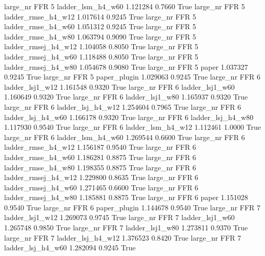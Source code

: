   large_nr      FFR                 5   ladder_lsm_h4_w60   1.121284      0.7660    True
  large_nr      FFR                 5  ladder_rmse_h4_w12   1.017614      0.9245    True
  large_nr      FFR                 5  ladder_rmse_h4_w60   1.051312      0.9245    True
  large_nr      FFR                 5  ladder_rmse_h4_w80   1.063794      0.9090    True
  large_nr      FFR                 5 ladder_rmsej_h4_w12   1.104058      0.8050    True
  large_nr      FFR                 5 ladder_rmsej_h4_w60   1.118488      0.8050    True
  large_nr      FFR                 5 ladder_rmsej_h4_w80   1.054678      0.9080    True
  large_nr      FFR                 5               paper   1.037327      0.9245    True
  large_nr      FFR                 5        paper_plugin   1.029063      0.9245    True
  large_nr      FFR                 6     ladder_lsj1_w12   1.161548      0.9320    True
  large_nr      FFR                 6     ladder_lsj1_w60   1.160649      0.9320    True
  large_nr      FFR                 6     ladder_lsj1_w80   1.165937      0.9320    True
  large_nr      FFR                 6   ladder_lsj_h4_w12   1.254604      0.7965    True
  large_nr      FFR                 6   ladder_lsj_h4_w60   1.166178      0.9320    True
  large_nr      FFR                 6   ladder_lsj_h4_w80   1.117930      0.9540    True
  large_nr      FFR                 6   ladder_lsm_h4_w12   1.112461      1.0000    True
  large_nr      FFR                 6   ladder_lsm_h4_w60   1.269544      0.6600    True
  large_nr      FFR                 6  ladder_rmse_h4_w12   1.156187      0.9540    True
  large_nr      FFR                 6  ladder_rmse_h4_w60   1.186281      0.8875    True
  large_nr      FFR                 6  ladder_rmse_h4_w80   1.198355      0.8875    True
  large_nr      FFR                 6 ladder_rmsej_h4_w12   1.229800      0.8635    True
  large_nr      FFR                 6 ladder_rmsej_h4_w60   1.271465      0.6600    True
  large_nr      FFR                 6 ladder_rmsej_h4_w80   1.185881      0.8875    True
  large_nr      FFR                 6               paper   1.151028      0.9540    True
  large_nr      FFR                 6        paper_plugin   1.144678      0.9540    True
  large_nr      FFR                 7     ladder_lsj1_w12   1.269073      0.9745    True
  large_nr      FFR                 7     ladder_lsj1_w60   1.265748      0.9850    True
  large_nr      FFR                 7     ladder_lsj1_w80   1.273811      0.9370    True
  large_nr      FFR                 7   ladder_lsj_h4_w12   1.376523      0.8420    True
  large_nr      FFR                 7   ladder_lsj_h4_w60   1.282094      0.9245    True
